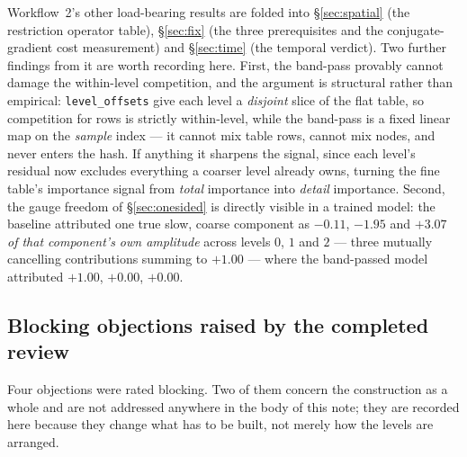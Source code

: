 \documentclass[11pt,a4paper]{article}
\begin{document}
\noindent
Workflow~2's other load-bearing results are folded into \S\ref{sec:spatial} (the restriction
operator table), \S\ref{sec:fix} (the three prerequisites and the conjugate-gradient cost
measurement) and \S\ref{sec:time} (the temporal verdict). Two further findings from it are
worth recording here. First, the band-pass provably cannot damage the within-level
competition, and the argument is structural rather than empirical: \texttt{level\_offsets}
give each level a \emph{disjoint} slice of the flat table, so competition for rows is
strictly within-level, while the band-pass is a fixed linear map on the \emph{sample} index
--- it cannot mix table rows, cannot mix nodes, and never enters the hash. If anything it
sharpens the signal, since each level's residual now excludes everything a coarser level
already owns, turning the fine table's importance signal from \emph{total} importance into
\emph{detail} importance. Second, the gauge freedom of \S\ref{sec:onesided} is directly
visible in a trained model: the baseline attributed one true slow, coarse component as
$-0.11$, $-1.95$ and $+3.07$ \emph{of that component's own amplitude} across levels $0$, $1$
and $2$ --- three mutually cancelling contributions summing to $+1.00$ --- where the
band-passed model attributed $+1.00$, $+0.00$, $+0.00$.

\subsection{Blocking objections raised by the completed review}
\label{app:blocking}

Four objections were rated blocking. Two of them concern the construction as a whole and are
not addressed anywhere in the body of this note; they are recorded here because they change
what has to be built, not merely how the levels are arranged.
\end{document}
